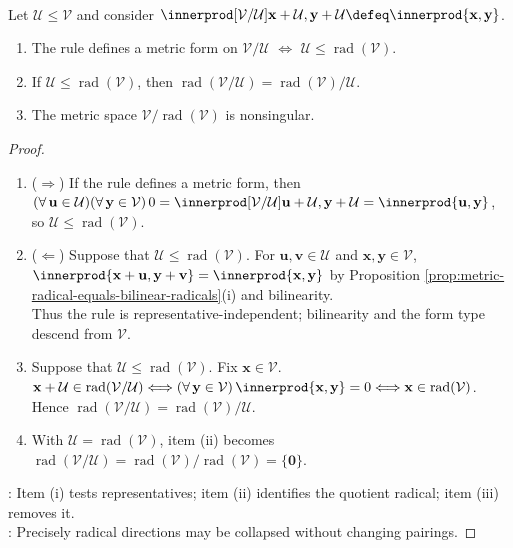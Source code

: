\begin{proposition} \label{prop:metric-quotients-by-radical-subspaces} \\
Let $\mathcal{U}\leq\mathcal{V}$ and consider $\innerprod[\mathcal{V}/\mathcal{U}]{\mathbf{x}+\mathcal{U},\mathbf{y}+\mathcal{U}}\defeq\innerprod{\mathbf{x},\mathbf{y}}$.
\begin{enumerate}[label=(\roman*)]
\setlength{\itemsep}{0pt}
\item The rule defines a metric form on $\mathcal{V}/\mathcal{U}$ $\Longleftrightarrow$ $\mathcal{U}\leq\operatorname{rad}(\mathcal{V})$.
\item If $\mathcal{U}\leq\operatorname{rad}(\mathcal{V})$, then $\operatorname{rad}(\mathcal{V}/\mathcal{U})=\operatorname{rad}(\mathcal{V})/\mathcal{U}$.
\item The metric space $\mathcal{V}/\operatorname{rad}(\mathcal{V})$ is nonsingular.
\end{enumerate}
\begin{proof}
\begin{enumerate}[label=(\roman*)]
\setlength{\itemsep}{0pt}
\item[$(i)$] ($\Rightarrow$) If the rule defines a metric form, then $(\forall\,\mathbf{u}\in\mathcal{U})(\forall\,\mathbf{y}\in\mathcal{V})\,0=\innerprod[\mathcal{V}/\mathcal{U}]{\mathbf{u}+\mathcal{U},\mathbf{y}+\mathcal{U}}=\innerprod{\mathbf{u},\mathbf{y}}$, so $\mathcal{U}\leq\operatorname{rad}(\mathcal{V})$.
\item[$(i)$] ($\Leftarrow$) Suppose that $\mathcal{U}\leq\operatorname{rad}(\mathcal{V})$. For $\mathbf{u},\mathbf{v}\in\mathcal{U}$ and $\mathbf{x},\mathbf{y}\in\mathcal{V}$, $\innerprod{\mathbf{x}+\mathbf{u},\mathbf{y}+\mathbf{v}}=\innerprod{\mathbf{x},\mathbf{y}}$ by Proposition \ref{prop:metric-radical-equals-bilinear-radicals}(i) and bilinearity.\\
Thus the rule is representative-independent; bilinearity and the form type descend from $\mathcal{V}$.
\item[$(ii)$] Suppose that $\mathcal{U}\leq\operatorname{rad}(\mathcal{V})$. Fix $\mathbf{x}\in\mathcal{V}$. $\mathbf{x}+\mathcal{U}\in\operatorname{rad}(\mathcal{V}/\mathcal{U})\Longleftrightarrow(\forall\,\mathbf{y}\in\mathcal{V})\,\innerprod{\mathbf{x},\mathbf{y}}=0\Longleftrightarrow\mathbf{x}\in\operatorname{rad}(\mathcal{V})$. Hence $\operatorname{rad}(\mathcal{V}/\mathcal{U})=\operatorname{rad}(\mathcal{V})/\mathcal{U}$.
\item[$(iii)$] With $\mathcal{U}=\operatorname{rad}(\mathcal{V})$, item (ii) becomes $\operatorname{rad}(\mathcal{V}/\mathcal{U})=\operatorname{rad}(\mathcal{V})/\operatorname{rad}(\mathcal{V})=\{\mathbf{0}\}$.
\end{enumerate}
: Item (i) tests representatives; item (ii) identifies the quotient radical; item (iii) removes it.\\
: Precisely radical directions may be collapsed without changing pairings.
\end{proof}
\end{proposition}

